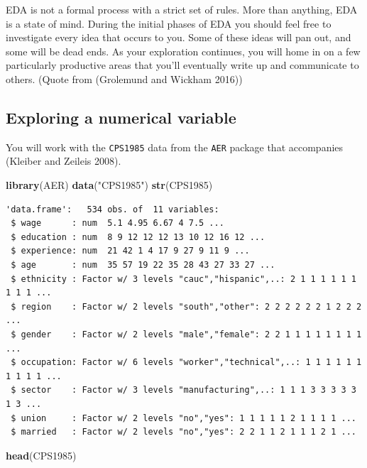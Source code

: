 \documentclass[
]{book}
\newenvironment{Shaded}{\begin{snugshade}}{\end{snugshade}}
\newcommand{\KeywordTok}[1]{\textcolor[rgb]{0.13,0.29,0.53}{\textbf{#1}}}
\newcommand{\NormalTok}[1]{#1}
\newcommand{\StringTok}[1]{\textcolor[rgb]{0.31,0.60,0.02}{#1}}
\begin{document}
EDA is not a formal process with a strict set of rules. More than anything, EDA is a state of mind. During the initial phases of EDA you should feel free to investigate every idea that occurs to you. Some of these ideas will pan out, and some will be dead ends. As your exploration continues, you will home in on a few particularly productive areas that you'll eventually write up and communicate to others. (Quote from (Grolemund and Wickham 2016))

\hypertarget{exploring-a-numerical-variable}{%
\subsection{Exploring a numerical variable}\label{exploring-a-numerical-variable}}

You will work with the \texttt{CPS1985} data from the \texttt{AER} package that accompanies (Kleiber and Zeileis 2008).

\begin{Shaded}
\begin{Highlighting}[]
\KeywordTok{library}\NormalTok{(AER)}
\KeywordTok{data}\NormalTok{(}\StringTok{"CPS1985"}\NormalTok{)}
\KeywordTok{str}\NormalTok{(CPS1985)}
\end{Highlighting}
\end{Shaded}

\begin{verbatim}
'data.frame':	534 obs. of  11 variables:
 $ wage      : num  5.1 4.95 6.67 4 7.5 ...
 $ education : num  8 9 12 12 12 13 10 12 16 12 ...
 $ experience: num  21 42 1 4 17 9 27 9 11 9 ...
 $ age       : num  35 57 19 22 35 28 43 27 33 27 ...
 $ ethnicity : Factor w/ 3 levels "cauc","hispanic",..: 2 1 1 1 1 1 1 1 1 1 ...
 $ region    : Factor w/ 2 levels "south","other": 2 2 2 2 2 2 1 2 2 2 ...
 $ gender    : Factor w/ 2 levels "male","female": 2 2 1 1 1 1 1 1 1 1 ...
 $ occupation: Factor w/ 6 levels "worker","technical",..: 1 1 1 1 1 1 1 1 1 1 ...
 $ sector    : Factor w/ 3 levels "manufacturing",..: 1 1 1 3 3 3 3 3 1 3 ...
 $ union     : Factor w/ 2 levels "no","yes": 1 1 1 1 1 2 1 1 1 1 ...
 $ married   : Factor w/ 2 levels "no","yes": 2 2 1 1 2 1 1 1 2 1 ...
\end{verbatim}

\begin{Shaded}
\begin{Highlighting}[]
\KeywordTok{head}\NormalTok{(CPS1985) }
\end{Highlighting}
\end{Shaded}
\end{document}
